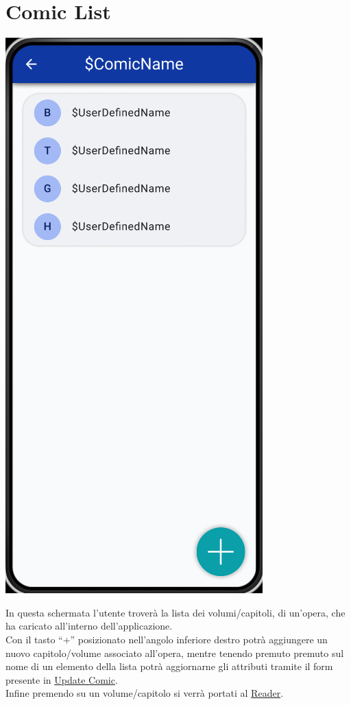 \documentclass{report}
\begin{document}
\section{Comic List}\label{sec:comic_list}

\begin{center}
  \includegraphics[scale=0.4]{comic_list.png}
\end{center}

In questa schermata l'utente troverà la lista dei volumi/capitoli, di un'opera, che ha caricato all'interno dell'applicazione.\\
Con il tasto ``+'' posizionato nell'angolo inferiore destro potrà aggiungere un nuovo capitolo/volume associato all'opera, mentre tenendo premuto premuto sul nome di un elemento della lista potrà aggiornarne gli attributi tramite il form presente in \hyperref[sec:update_comic]{Update Comic}.\\
Infine premendo su un volume/capitolo si verrà portati al \hyperref[sec:reader]{Reader}.
\end{document}
